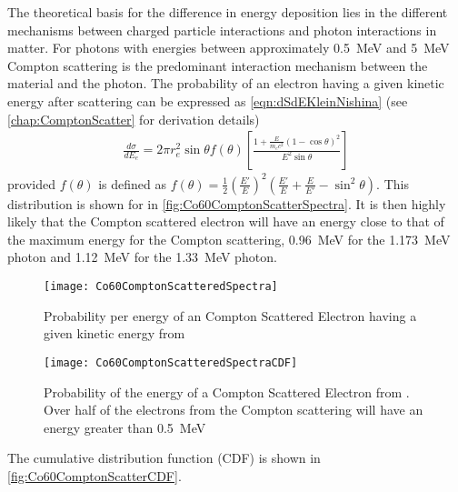 The theoretical basis for the difference in energy deposition lies in the different mechanisms between charged particle interactions and photon interactions in matter.
For photons with energies between approximately \SI{0.5}{\MeV} and \SI{5}{\MeV} Compton scattering is the predominant interaction mechanism between the material and the photon.
The probability of an electron having a given kinetic energy after scattering can be expressed as \autoref{eqn:dSdEKleinNishina} (see \autoref{chap:ComptonScatter} for derivation details)
\begin{align}
  \label{eqn:dSdEKleinNishina}
\frac{d\sigma}{dE_e} = 2\pi r_e^2 \sin \theta f(\theta)\left [ \frac{1+\frac{E}{m_e c^2}\left(1-\cos\theta \right)^2}{E^2 \sin \theta} \right ]
\end{align}
provided  $f(\theta)$ is defined as $f(\theta) = \frac{1}{2}\left(\frac{E'}{E}\right)^2 \left(\frac{E'}{E} + \frac{E}{E'}-\sin^2\theta\right)$.
This distribution is shown for  in \autoref{fig:Co60ComptonScatterSpectra}.
It is then highly likely that the Compton scattered electron will have an energy close to that of the maximum energy for the Compton scattering, \SI{0.96}{\MeV} for the \SI{1.173}{\MeV} photon and \SI{1.12}{\MeV} for the \SI{1.33}{\MeV} photon.
\begin{figure}
  \centering
    \texttt{[image: Co60ComptonScatteredSpectra]}
    \caption[Analytical Co-60 Compton Electron Kinetic Energy Spectra]{Probability per energy of an Compton Scattered Electron having a given kinetic energy from }
    \label{fig:Co60ComptonScatterSpectra}
  \end{figure}
\begin{figure}
    \texttt{[image: Co60ComptonScatteredSpectraCDF]}
    \caption[Analytical Co-60 Compton Electron Kinetic Energy Cumulative Distribution]{Probability of the energy of a Compton Scattered Electron from . Over half of the electrons from the Compton scattering will have an energy greater than \SI{0.5}{\MeV}}
    \label{fig:Co60ComptonScatterCDF}
\end{figure}
The cumulative distribution function (CDF) is shown in \autoref{fig:Co60ComptonScatterCDF}.
